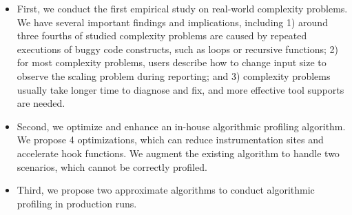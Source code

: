 \begin{itemize}

\item First, we conduct the first empirical study on real-world complexity problems. 
We have several important findings and implications, including
1) around three fourths of studied complexity problems are 
caused by repeated executions of buggy code constructs,
such as loops or recursive functions;
2) for most complexity problems, 
users describe how to change input size to observe the scaling problem during reporting;
and 3) complexity problems usually take longer time to diagnose and fix, 
and more effective tool supports are needed.  

\item Second, we optimize and enhance an in-house algorithmic profiling algorithm.
We propose 4 optimizations, 
which can reduce instrumentation sites and accelerate hook functions.
We augment the existing algorithm to handle two scenarios, 
which cannot be correctly profiled. 




\item Third, we propose two approximate algorithms to conduct algorithmic profiling in production runs. 

\end{itemize}

